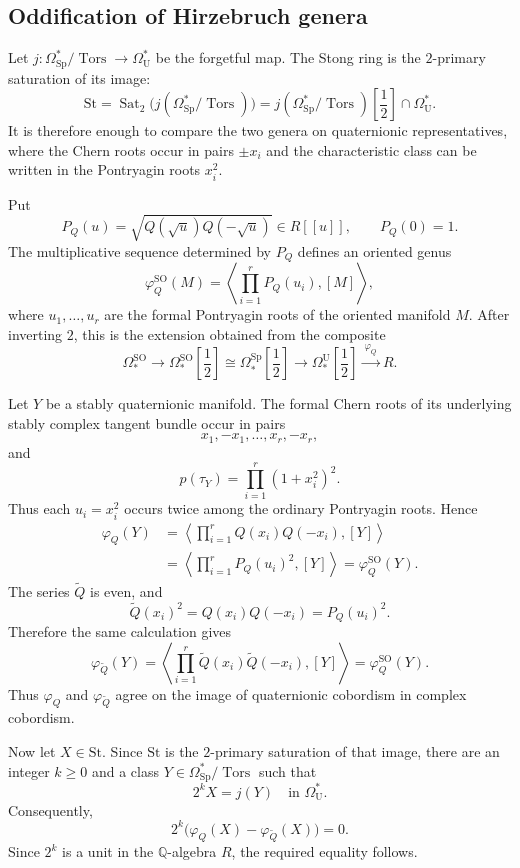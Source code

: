 \documentclass[14pt,dvipsnames]{extarticle}
\makeatletter
\numberwithin{equation}{subsection}
\theoremstyle{plain}
\theoremstyle{definition}
\theoremstyle{definition}
\renewenvironment{proof}[1][\proofname]{
 \par\pushQED{\qed}\normalfont
 \topsep6\p@\@plus6\p@\relax
 \trivlist\item[\hskip\labelsep\bfseries\itshape #1\@addpunct{.}]
}{\popQED\endtrivlist\@endpefalse}
\DeclareMathOperator{\Tors}{Tors}
\newcommand{\OmU}{\Omega_{\mathrm U}^{\ast}}
\newcommand{\OmSp}{\Omega_{\mathrm{Sp}}^{\ast}}
\newcommand{\St}{\mathrm{St}}
\makeatother
\begin{document}
\subsection{Oddification of Hirzebruch genera}
\label{sec:oddification}

Let $j\colon\OmSp/\Tors\to\OmU$ be the forgetful map. The Stong ring is the
$2$-primary saturation of its image:
\[
 \St=\operatorname{Sat}_2\bigl(j(\OmSp/\Tors)\bigr)
 =j(\OmSp/\Tors)\!\left[\frac12\right]\cap\OmU.
\]
It is therefore enough to compare the two genera on quaternionic
representatives, where the Chern roots occur in pairs $\pm x_i$ and the
characteristic class can be written in the Pontryagin roots $x_i^2$.

\begin{proof}[Proof of \cref{thm:oddification-stong}]
Put
\begin{equation}\label{eq:oriented-series-Q}
 P_Q(u)=\sqrt{Q(\sqrt{u})Q(-\sqrt{u})}\in R[[u]],\qquad P_Q(0)=1.
\end{equation}
The multiplicative sequence determined by $P_Q$ defines an oriented genus
\begin{equation}\label{eq:oriented-extension-Q}
 \varphi_Q^{\mathrm{SO}}(M)
 =\left\langle\prod_{i=1}^rP_Q(u_i),[M]\right\rangle,
\end{equation}
where $u_1,\ldots,u_r$ are the formal Pontryagin roots of the oriented
manifold $M$. After inverting $2$, this is the extension obtained from the
composite \cite{Sto67}
\[
 \Omega_*^{\mathrm{SO}}\longrightarrow
 \Omega_*^{\mathrm{SO}}\!\left[\frac12\right]
 \cong
 \Omega_*^{\mathrm{Sp}}\!\left[\frac12\right]
 \longrightarrow
 \Omega_*^{\mathrm U}\!\left[\frac12\right]
 \xrightarrow{\ \varphi_Q\ } R.
\]

Let $Y$ be a stably quaternionic manifold. The formal Chern roots of its
underlying stably complex tangent bundle occur in pairs
\[
 x_1,-x_1,\ldots,x_r,-x_r,
\]
and
\[
 p(\tau_Y)=\prod_{i=1}^r(1+x_i^2)^2.
\]
Thus each $u_i=x_i^2$ occurs twice among the ordinary Pontryagin roots. Hence
\begin{align*}
 \varphi_Q(Y)
 &=\left\langle
   \prod_{i=1}^r Q(x_i)Q(-x_i),[Y]
  \right\rangle\\
 &=\left\langle
   \prod_{i=1}^r P_Q(u_i)^2,[Y]
  \right\rangle
 =\varphi_Q^{\mathrm{SO}}(Y).
\end{align*}
The series $\widetilde Q$ is even, and
\[
 \widetilde Q(x_i)^2
 =Q(x_i)Q(-x_i)
 =P_Q(u_i)^2.
\]
Therefore the same calculation gives
\[
 \varphi_{\widetilde Q}(Y)
 =\left\langle
   \prod_{i=1}^r\widetilde Q(x_i)\widetilde Q(-x_i),[Y]
  \right\rangle
 =\varphi_Q^{\mathrm{SO}}(Y).
\]
Thus $\varphi_Q$ and $\varphi_{\widetilde Q}$ agree on the image of
quaternionic cobordism in complex cobordism.

Now let $X\in\St$. Since $\St$ is the $2$-primary saturation of that image, there are
an integer $k\geq0$ and a class $Y\in\OmSp/\Tors$ such that
\[
 2^kX=j(Y)\quad\text{in }\OmU.
\]
Consequently,
\[
 2^k\bigl(\varphi_Q(X)-\varphi_{\widetilde Q}(X)\bigr)=0.
\]
Since $2^k$ is a unit in the $\mathbb Q$-algebra $R$, the required equality
follows.
\end{proof}
\end{document}
